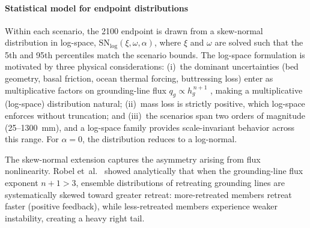 \documentclass[12pt]{article}
\newcommand{\subsubsubsection}[1]{\paragraph{#1}\mbox{}\par}
\begin{document}
\subsubsubsection{Statistical model for endpoint distributions}

Within each scenario, the 2100 endpoint is drawn from a skew-normal distribution in log-space, $\mathrm{SN}_{\log}(\xi, \omega, \alpha)$, where $\xi$ and $\omega$ are solved such that the 5th and 95th percentiles match the scenario bounds. The log-space formulation is motivated by three physical considerations: (i)~the dominant uncertainties (bed geometry, basal friction, ocean thermal forcing, buttressing loss) enter as multiplicative factors on grounding-line flux $q_g \propto h_g^{\,n+1}$ \citep{Schoof2007}, making a multiplicative (log-space) distribution natural; (ii)~mass loss is strictly positive, which log-space enforces without truncation; and (iii)~the scenarios span two orders of magnitude (25--1300~mm), and a log-space family provides scale-invariant behavior across this range. For $\alpha = 0$, the distribution reduces to a log-normal.

The skew-normal extension captures the asymmetry arising from flux nonlinearity. Robel et~al.~\citep{Robel2019} showed analytically that when the grounding-line flux exponent $n + 1 > 3$, ensemble distributions of retreating grounding lines are systematically skewed toward greater retreat: more-retreated members retreat faster (positive feedback), while less-retreated members experience weaker instability, creating a heavy right tail. %

\end{document}
